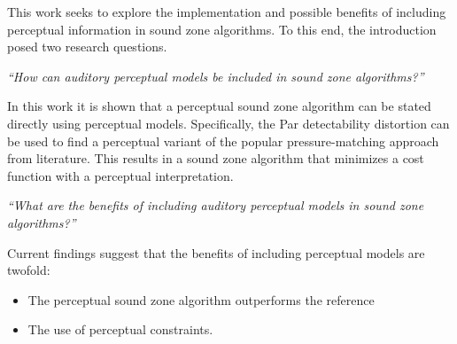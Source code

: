 This work seeks to explore the implementation and possible benefits of including perceptual information in 
sound zone algorithms.
To this end, the introduction posed two research questions.

\begin{center}
    {\textit{``How can auditory perceptual models be included in sound zone algorithms?''}}\\
\end{center}
In this work it is shown that a perceptual sound zone algorithm can be stated directly using perceptual models. 
Specifically, the Par detectability distortion can be used to find a perceptual variant of the 
popular pressure-matching approach from literature.
This results in a sound zone algorithm that minimizes a cost function with a perceptual interpretation.

\begin{center}
    {\textit{``What are the benefits of including auditory perceptual models in sound zone algorithms?''}}\\
\end{center}
Current findings suggest that the benefits of including perceptual models are twofold:
\begin{itemize}
    \item The perceptual sound zone algorithm outperforms the reference
    \item The use of perceptual constraints.
\end{itemize}

